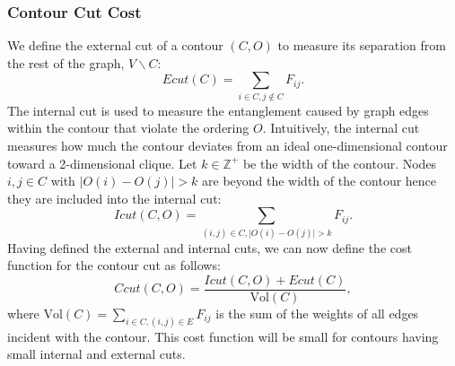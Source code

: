 \documentclass{SMBV12}
\begin{document}
\subsubsection{Contour Cut Cost}
We define the external cut of a contour $(C, O)$ to measure its separation from the rest of the graph, $V \backslash C$:
\begin{equation}
Ecut(C) = \sum\limits_{i \in C, j \notin C} F_{ij}.
\end{equation}
The internal cut is used to measure the entanglement caused by graph edges within the contour that violate the
ordering $O$. Intuitively, the internal cut measures how much the contour deviates from an ideal one-dimensional contour toward a 2-dimensional clique. Let $k \in \mathbb{Z}^+$ be the width of the contour. Nodes $i, j \in C$ with $\lvert O(i) - O(j) \rvert > k$ are beyond the width of the contour hence they are included into the internal cut:
\begin{equation}
Icut(C, O) = \sum\limits_{(i, j) \in C, \lvert O(i) - O(j) \rvert > k} F_{ij}.
\end{equation}
Having defined the external and internal cuts, we can now define the cost function for the contour cut as follows:
\begin{equation}
Ccut(C, O) = \dfrac{Icut(C, O) + Ecut(C)}{\mathrm{Vol}(C)},
\end{equation}
where $\mathrm{Vol}(C) = \sum_{i \in C, (i, j) \in E} F_{ij}$ is the sum of the weights of all edges incident with the contour. This cost function will be small for contours having small internal and external cuts.
\end{document}
